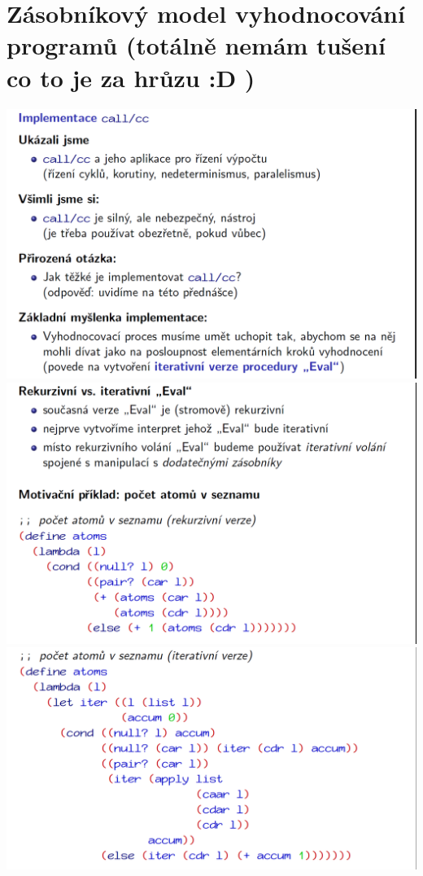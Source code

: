 \documentclass[10pt,a4paper]{article}
\begin{document}
\section{Zásobníkový model vyhodnocování programů (totálně nemám tušení co to je za hrůzu :D )}
\begin{center}
	\includegraphics[scale=0.35]{img/zasobnikovy_model_1}
	\includegraphics[scale=0.35]{img/zasobnikovy_model_2}
	\includegraphics[scale=0.3]{img/zasobnikovy_model_3}

\end{center}
\end{document}
